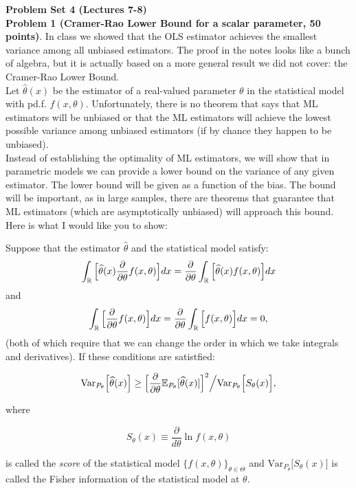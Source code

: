 \documentclass[11pt]{article} %
\begin{document}
\onehalfspace

\noindent \textbf{Problem Set 4 (Lectures 7-8)} \\

\noindent \textbf{Problem 1 (Cramer-Rao Lower Bound for a scalar parameter, 50 points)}. In class we showed that the OLS estimator achieves the smallest variance among all unbiased estimators. The proof in the notes looks like a bunch of algebra, but it is actually based on a more general result we did not cover: the Cramer-Rao Lower Bound.\\

\noindent Let $\widehat{\theta}(x)$ be the estimator of a real-valued parameter $\theta$ in the statistical model with pd.f. $f(x,\theta)$. Unfortunately, there is no theorem that says that ML estimators will be unbiased or that the ML estimators will achieve the lowest possible variance among unbiased estimators (if by chance they happen to be unbiased). \\

\noindent Instead of establishing the optimality of ML estimators, we will show that in parametric models we can provide a lower bound on the variance of any given estimator. The lower bound will be given as a function of the bias. The bound will be important, as in large samples, there are theorems that guarantee that ML estimators (which are asymptotically unbiased) will approach this bound. \\

Here is what I would like you to show:

\begin{proposition}
Suppose that the estimator $\widehat{\theta}$ and the statistical model satisfy:
\begin{equation} \label{equation:regCR}
\int_{\mathbb{R}}\Big[ \widehat{\theta}(x) \frac{\partial}{\partial \theta}f(x,\theta) \Big] dx =  \frac{\partial}{\partial \theta} \int_{\mathbb{R}}\Big[ \widehat{\theta}(x) f(x,\theta) \Big] dx
\end{equation}
and 
\begin{equation}\label{equation:scoreCR}
\int_{\mathbb{R}} \Big[ \frac{\partial}{\partial \theta}f(x,\theta)  \Big] dx= \frac{\partial}{\partial \theta} \int_{\mathbb{R}} \Big[ f(x,\theta)  \Big] dx=0,
\end{equation}
\noindent (both of which require that we can change the order in which we take integrals and derivatives). If these conditions are satistfied:

$$\text{Var}_{P_\theta}\Big[ \widehat{\theta}(x)\Big] \geq \Big[ \frac{\partial}{\partial \theta} \mathbb{E}_{P_\theta}[\widehat{\theta}(x)] \Big]^2 \Big/ \text{Var}_{P_\theta}\Big[S_{\theta}(x) \Big],$$

\noindent where

$$S_{\theta}(x) \equiv \frac{\partial}{d\theta} \ln f(x,\theta)$$

\noindent is called the \emph{score} of the statistical model $\{f(x,\theta)\}_{\theta \in \Theta}$ and $\text{Var}_{P_\theta}\Big[S_{\theta}(x) \Big]$ is called the Fisher information of the statistical model at $\theta$. 


\end{proposition}
\end{document}
